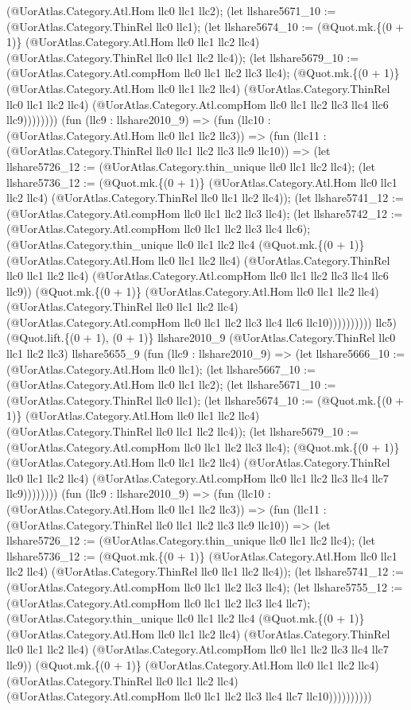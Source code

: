 \documentclass[11pt]{article}
\begin{document}
(@UorAtlas.Category.Atl.Hom llc0 llc1 llc2); (let llshare5671\_10 := (@UorAtlas.Category.ThinRel llc0 llc1); (let llshare5674\_10 := (@Quot.mk.\{(0 + 1)\} (@UorAtlas.Category.Atl.Hom llc0 llc1 llc2 llc4) (@UorAtlas.Category.ThinRel llc0 llc1 llc2 llc4)); (let llshare5679\_10 := (@UorAtlas.Category.Atl.compHom llc0 llc1 llc2 llc3 llc4); (@Quot.mk.\{(0 + 1)\} (@UorAtlas.Category.Atl.Hom llc0 llc1 llc2 llc4) (@UorAtlas.Category.ThinRel llc0 llc1 llc2 llc4) (@UorAtlas.Category.Atl.compHom llc0 llc1 llc2 llc3 llc4 llc6 llc9)))))))) (fun (llc9 : llshare2010\_9) => (fun (llc10 : (@UorAtlas.Category.Atl.Hom llc0 llc1 llc2 llc3)) => (fun (llc11 : (@UorAtlas.Category.ThinRel llc0 llc1 llc2 llc3 llc9 llc10)) => (let llshare5726\_12 := (@UorAtlas.Category.thin\_unique llc0 llc1 llc2 llc4); (let llshare5736\_12 := (@Quot.mk.\{(0 + 1)\} (@UorAtlas.Category.Atl.Hom llc0 llc1 llc2 llc4) (@UorAtlas.Category.ThinRel llc0 llc1 llc2 llc4)); (let llshare5741\_12 := (@UorAtlas.Category.Atl.compHom llc0 llc1 llc2 llc3 llc4); (let llshare5742\_12 := (@UorAtlas.Category.Atl.compHom llc0 llc1 llc2 llc3 llc4 llc6); (@UorAtlas.Category.thin\_unique llc0 llc1 llc2 llc4 (@Quot.mk.\{(0 + 1)\} (@UorAtlas.Category.Atl.Hom llc0 llc1 llc2 llc4) (@UorAtlas.Category.ThinRel llc0 llc1 llc2 llc4) (@UorAtlas.Category.Atl.compHom llc0 llc1 llc2 llc3 llc4 llc6 llc9)) (@Quot.mk.\{(0 + 1)\} (@UorAtlas.Category.Atl.Hom llc0 llc1 llc2 llc4) (@UorAtlas.Category.ThinRel llc0 llc1 llc2 llc4) (@UorAtlas.Category.Atl.compHom llc0 llc1 llc2 llc3 llc4 llc6 llc10)))))))))) llc5) (@Quot.lift.\{(0 + 1), (0 + 1)\} llshare2010\_9 (@UorAtlas.Category.ThinRel llc0 llc1 llc2 llc3) llshare5655\_9 (fun (llc9 : llshare2010\_9) => (let llshare5666\_10 := (@UorAtlas.Category.Atl.Hom llc0 llc1); (let llshare5667\_10 := (@UorAtlas.Category.Atl.Hom llc0 llc1 llc2); (let llshare5671\_10 := (@UorAtlas.Category.ThinRel llc0 llc1); (let llshare5674\_10 := (@Quot.mk.\{(0 + 1)\} (@UorAtlas.Category.Atl.Hom llc0 llc1 llc2 llc4) (@UorAtlas.Category.ThinRel llc0 llc1 llc2 llc4)); (let llshare5679\_10 := (@UorAtlas.Category.Atl.compHom llc0 llc1 llc2 llc3 llc4); (@Quot.mk.\{(0 + 1)\} (@UorAtlas.Category.Atl.Hom llc0 llc1 llc2 llc4) (@UorAtlas.Category.ThinRel llc0 llc1 llc2 llc4) (@UorAtlas.Category.Atl.compHom llc0 llc1 llc2 llc3 llc4 llc7 llc9)))))))) (fun (llc9 : llshare2010\_9) => (fun (llc10 : (@UorAtlas.Category.Atl.Hom llc0 llc1 llc2 llc3)) => (fun (llc11 : (@UorAtlas.Category.ThinRel llc0 llc1 llc2 llc3 llc9 llc10)) => (let llshare5726\_12 := (@UorAtlas.Category.thin\_unique llc0 llc1 llc2 llc4); (let llshare5736\_12 := (@Quot.mk.\{(0 + 1)\} (@UorAtlas.Category.Atl.Hom llc0 llc1 llc2 llc4) (@UorAtlas.Category.ThinRel llc0 llc1 llc2 llc4)); (let llshare5741\_12 := (@UorAtlas.Category.Atl.compHom llc0 llc1 llc2 llc3 llc4); (let llshare5755\_12 := (@UorAtlas.Category.Atl.compHom llc0 llc1 llc2 llc3 llc4 llc7); (@UorAtlas.Category.thin\_unique llc0 llc1 llc2 llc4 (@Quot.mk.\{(0 + 1)\} (@UorAtlas.Category.Atl.Hom llc0 llc1 llc2 llc4) (@UorAtlas.Category.ThinRel llc0 llc1 llc2 llc4) (@UorAtlas.Category.Atl.compHom llc0 llc1 llc2 llc3 llc4 llc7 llc9)) (@Quot.mk.\{(0 + 1)\} (@UorAtlas.Category.Atl.Hom llc0 llc1 llc2 llc4) (@UorAtlas.Category.ThinRel llc0 llc1 llc2 llc4) (@UorAtlas.Category.Atl.compHom llc0 llc1 llc2 llc3 llc4 llc7 llc10)))))))))) 
\end{document}

